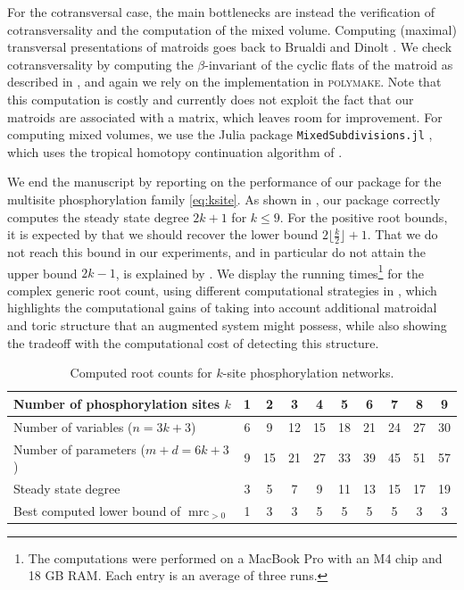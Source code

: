 \documentclass[11pt,reqno,a4paper]{amsart}
\numberwithin{equation}{section}
\theoremstyle{theoremstyle}
\theoremstyle{examplestyle}
\DeclareMathOperator{\mrc}{mrc}
\begin{document}
For the cotransversal case, the main bottlenecks are instead the verification of cotransversality and the computation of the mixed volume. 
Computing (maximal) transversal presentations  of matroids goes back to Brualdi and Dinolt \cite{BrualdiDinolt:1972}. We check cotransversality by computing the $\beta$-invariant of the cyclic flats of the matroid as described in \cite{BKM11}, and again we rely on the implementation in \textsc{polymake}.
Note that this computation is costly and currently does not exploit the fact that our matroids are associated with a matrix, which leaves room for improvement.
For computing mixed volumes, we use the Julia package \texttt{MixedSubdivisions.jl}
\cite{mixedsubdivisions}, which uses the tropical homotopy continuation algorithm of \cite{Jensen16}.

We end the manuscript by reporting on the performance of our package for the multisite phosphorylation family \eqref{eq:ksite}. As shown in , our package correctly computes the steady state degree $2k+1$ for $k\leq 9$. For the positive root bounds, it is expected by \cite[Proposition~6.8]{RoseTelek24} that we should recover the lower bound $2\lfloor\frac{k}{2}\rfloor+1$. That we do not reach this bound in our experiments, and in particular do not attain the   upper bound $2k-1$, is explained by . 
We display the running times\footnote{The computations were performed on a MacBook Pro with an M4 chip and 18 GB RAM. Each entry is an average of three runs.} for the complex generic root count, using different computational strategies in  , which highlights the computational gains of taking into account additional matroidal and toric structure that an augmented system might possess, while also showing the tradeoff with the computational cost of detecting this structure.

\begin{table}[t]
\caption{Computed root counts for $k$-site phosphorylation networks.
}
\label{tab:counts_multisite}
\centering
\footnotesize
\begin{tabular}{lccccccccc}
\toprule
   Number of phosphorylation sites $k$ & 1 & 2 & 3 & 4 & 5 & 6 & 7 & 8 & 9  \\
      \midrule
Number of variables ($n=3k+3$) & 6 & 9 & 12 & 15 & 18 & 21 & 24 & 27 & 30\\
Number of parameters ($m+d=6k+3$)\quad & 9 & 15 & 21 & 27 & 33 & 39 & 45 & 51 & 57  \\\midrule
Steady state degree & 3 & 5 & 7 & 9 & 11 & 13 & 15 & 17 & 19\\
Best computed lower bound of $\mrc_{>0}$   & 1 & 3 & 3 & 5 & 5 &  5 & 5 & 3 & 3\\
  \bottomrule
\end{tabular}
\end{table} 
\end{document}
